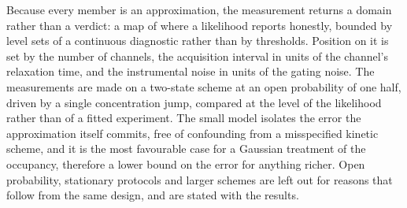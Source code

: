 Because every member is an approximation, the measurement returns a domain rather than a verdict: a
map of where a likelihood reports honestly, bounded by level sets of a continuous diagnostic rather
than by thresholds. Position on it is set by the number of channels, the acquisition interval in
units of the channel's relaxation time, and the instrumental noise in units of the gating noise. The
measurements are made on a two-state scheme at an open probability of one half, driven by a single
concentration jump, compared at the level of the likelihood rather than of a fitted experiment. The
small model isolates the error the approximation itself commits, free of confounding from a
misspecified kinetic scheme, and it is the most favourable case for a Gaussian treatment of the
occupancy, therefore a lower bound on the error for anything richer. Open probability, stationary
protocols and larger schemes are left out for reasons that follow from the same design, and are
stated with the results.


